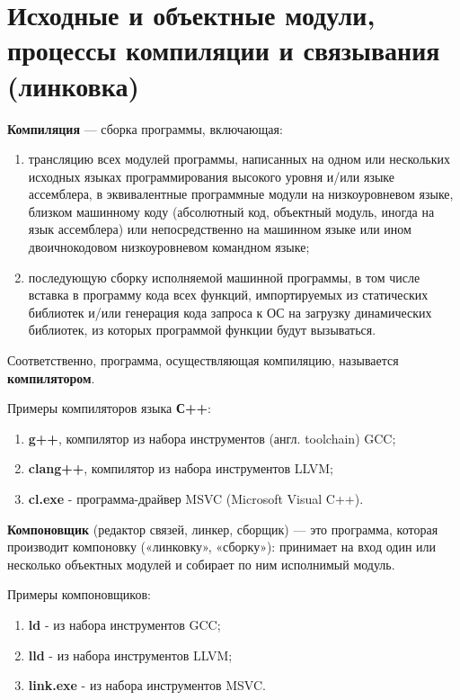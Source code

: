 \section{Исходные и объектные модули, процессы компиляции и связывания (линковка)}

\textbf{Компиляция} --- сборка программы, включающая:
\begin{enumerate}
  \item трансляцию всех модулей программы, написанных на одном или нескольких исходных языках
    программирования высокого уровня и/или языке ассемблера, в эквивалентные
    программные модули на низкоуровневом языке, близком машинному коду
    (абсолютный код, объектный модуль, иногда на язык ассемблера) или
    непосредственно на машинном языке или ином двоичнокодовом низкоуровневом
    командном языке;
  \item последующую сборку исполняемой машинной программы, в
    том числе вставка в программу кода всех функций, импортируемых из
    статических библиотек и/или генерация кода запроса к ОС на загрузку
    динамических библиотек, из которых программой функции будут вызываться.
\end{enumerate}

Соответственно, программа, осуществляющая компиляцию, называется
\textbf{компилятором}.

Примеры компиляторов языка \textbf{С++}:
\begin{enumerate}
  \item \textbf{g++}, компилятор из
  набора инструментов (англ. toolchain) GCC;
  \item \textbf{clang++},
  компилятор из набора инструментов LLVM;
  \item \textbf{cl.exe} -
  программа-драйвер MSVC (Microsoft Visual C++).
\end{enumerate}
\textbf{Компоновщик} (редактор связей, линкер, сборщик) --- это
программа, которая производит компоновку («линковку», «сборку»):
принимает на вход один или несколько объектных модулей и собирает по ним
исполнимый модуль.

Примеры компоновщиков:
\begin{enumerate}
  \item \textbf{ld} - из набора инструментов GCC;
  \item \textbf{lld} - из набора инструментов LLVM;
  \item \textbf{link.exe} - из набора инструментов MSVC.
\end{enumerate}

